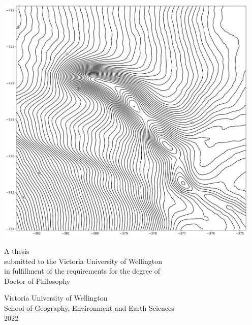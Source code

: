 \pagebreak
{
\centering
\thesistitle

\vspace{20mm}

\nameanddegrees

\vspace{20mm}

\centerline{\includegraphics[width=30pc]{frontmatter/contour.png}}


\vfill
A thesis \\
submitted to the Victoria University of Wellington \\
in fulfillment of the requirements for the degree of \\
Doctor of Philosophy \\

\vspace{10mm}

Victoria University of Wellington\\
School of Geography, Environment and Earth Sciences\\
2022\\

}
\pagebreak
